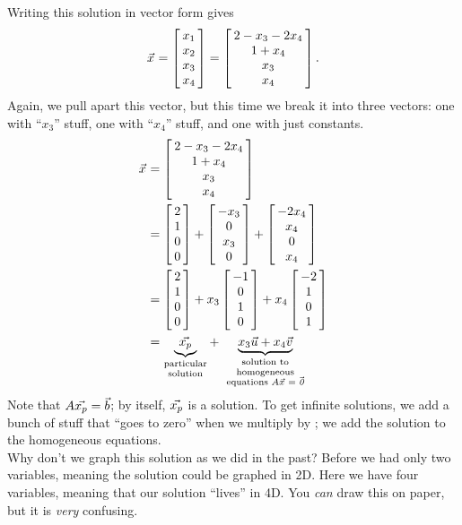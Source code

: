 {Writing this solution in vector form gives $$\vx = \bmx{c}x_1\\x_2\\x_3\\x_4\emx = \bmx{c}2-x_3-2x_4\\1+x_4\\x_3\\x_4\emx.$$ Again, we pull apart this vector, but this time we break it into three vectors: one with ``$x_3$'' stuff, one with ``$x_4$'' stuff, and one with just constants. 
\begin{align*} \vx &= \bmx{c}2-x_3-2x_4\\1+x_4\\x_3\\x_4\emx \\
&= \bmx{c}2\\1\\0\\0\emx + \bmx{c}-x_3\\0\\x_3\\0\emx + \bmx{c}-2x_4\\x_4\\0\\x_4\emx \\ 
&=\bmx{c}2\\1\\0\\0\emx+x_3\bmx{c}-1\\0\\1\\0\emx + x_4\bmx{c}-2\\1\\0\\1\emx\\
&=\underbrace{\vect{x_p}}_{\parbox{35pt}{\center {\vskip -10 pt} \scriptsize particular solution}}+\underbrace{x_3\vu + x_4\vv}_{\parbox{70pt}{\center {\vskip -10 pt} \scriptsize solution to homogeneous equations $\tta\vx=\zero$}} \end{align*}
Note that $\tta\vect{x_p} = \vb$; by itself, $\vect{x_p}$ is a solution. To get infinite solutions, we add a bunch of stuff that ``goes to zero'' when we multiply by \tta; we add the solution to the homogeneous equations.\\

Why don't we graph this solution as we did in the past? Before we had only two variables, meaning the solution could be graphed in 2D. Here we have four variables, meaning that our solution ``lives'' in 4D. You \textit{can} draw this on paper, but it is \textit{very} confusing.}\\ %

